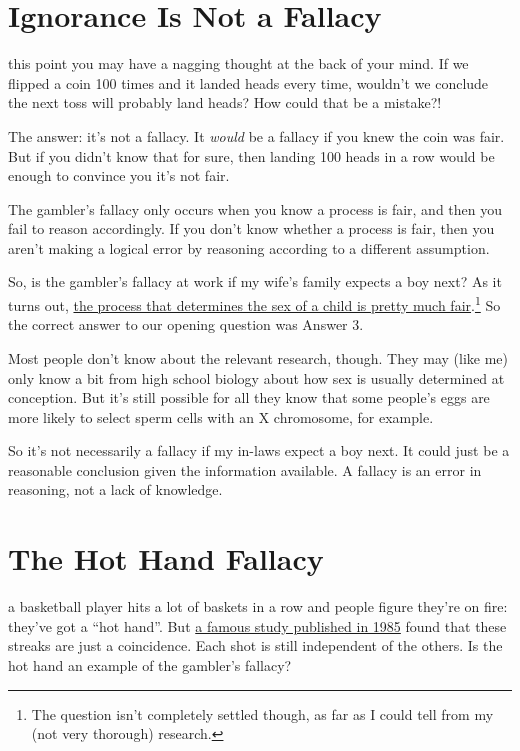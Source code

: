 \documentclass[justified]{tufte-book}
\theoremstyle{definition}
\theoremstyle{definition}
\theoremstyle{definition}
\theoremstyle{remark}
\begin{document}
\hypertarget{ignorance-is-not-a-fallacy}{%
\section{Ignorance Is Not a Fallacy}\label{ignorance-is-not-a-fallacy}}

 this point you may have a nagging thought at the back of your mind. If we flipped a coin 100 times and it landed heads every time, wouldn't we conclude the next toss will probably land heads? How could that be a mistake?!

The answer: it's not a fallacy. It \emph{would} be a fallacy if you knew the coin was fair. But if you didn't know that for sure, then landing 100 heads in a row would be enough to convince you it's not fair.

The gambler's fallacy only occurs when you know a process is fair, and then you fail to reason accordingly. If you don't know whether a process is fair, then you aren't making a logical error by reasoning according to a different assumption.

So, is the gambler's fallacy at work if my wife's family expects a boy next? As it turns out, \href{https://stat.duke.edu/~dalene/chance/chanceweb/144.rodgers.pdf}{the process that determines the sex of a child is pretty much fair}.\footnote{The question isn't completely settled though, as far as I could tell from my (not very thorough) research.} So the correct answer to our opening question was Answer 3.

Most people don't know about the relevant research, though. They may (like me) only know a bit from high school biology about how sex is usually determined at conception. But it's still possible for all they know that some people's eggs are more likely to select sperm cells with an X chromosome, for example.

So it's not necessarily a fallacy if my in-laws expect a boy next. It could just be a reasonable conclusion given the information available. A fallacy is an error in reasoning, not a lack of knowledge.

\hypertarget{the-hot-hand-fallacy}{%
\section{The Hot Hand Fallacy}\label{the-hot-hand-fallacy}}

 a basketball player hits a lot of baskets in a row and people figure they're on fire: they've got a ``hot hand''. But \href{http://www.sciencedirect.com/science/article/pii/0010028585900106?via\%3Dihub}{a famous study published in 1985} found that these streaks are just a coincidence. Each shot is still independent of the others. Is the hot hand an example of the gambler's fallacy?
\end{document}
